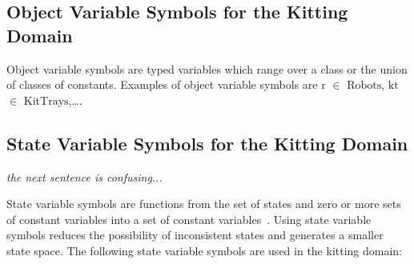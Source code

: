 \subsection{Object Variable Symbols for the Kitting Domain}
Object variable symbols are typed variables which range over a class or the union of classes of constants. Examples of object variable symbols are $\mathrm{r}$ $\in$ $\mathrm{Robots}$, $\mathrm{kt}$ $\in$ $\mathrm{KitTrays}$,\ldots.

\subsection{State Variable Symbols for the Kitting Domain}
{\it the next sentence is confusing...}

State variable symbols are functions from the set of states and zero or more sets of constant variables into a set of constant variables~\cite{NAU.2004}. Using state variable symbols reduces the possibility of inconsistent states and generates a smaller state space. The following state variable symbols are used in the kitting domain:

